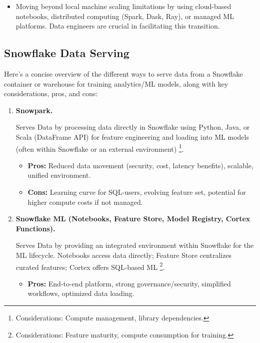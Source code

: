 \begin{enumerate}
\begin{itemize}
        \item Moving beyond local machine scaling limitations
        by using cloud-based notebooks, distributed computing
        (Spark, Dask, Ray), or managed ML platforms.
        Data engineers are crucial in facilitating this
        transition.
    \end{itemize}
\end{enumerate}


\subsection*{Snowflake Data Serving}
Here's a concise overview of the different ways to serve data
from a Snowflake container or warehouse for training
analytics/ML models, along with key considerations, pros,
and cons:
\begin{enumerate}
    \item \textbf{Snowpark.}
    
    \noindent
    Serves Data by processing data directly in Snowflake
    using Python, Java, or Scala (DataFrame API) for
    feature engineering and loading into ML models
    (often within Snowflake or an external environment)
    \footnote{
        Considerations: Compute management, library
        dependencies.
    }.

    \begin{itemize}
        \item \textbf{Pros:} Reduced data movement
        (security, cost, latency benefits),
        scalable, unified environment.

        \item \textbf{Cons:} Learning curve for SQL-users,
        evolving feature set, potential for higher
        compute costs if not managed.
    \end{itemize}

    
    \item \textbf{Snowflake ML (Notebooks, Feature Store,
    Model Registry, Cortex Functions).}
    
    \noindent
    Serves Data by providing an integrated environment
    within Snowflake for the ML lifecycle.
    Notebooks access data directly; Feature Store
    centralizes curated features; Cortex offers
    SQL-based ML
    \footnote{
        Considerations: Feature maturity,
        compute consumption for training.
    }.
    \begin{itemize}
        \item \textbf{Pros:} End-to-end platform,
        strong governance/security,
        simplified workflows,
        optimized data loading.
        

\end{itemize}
\end{enumerate}
